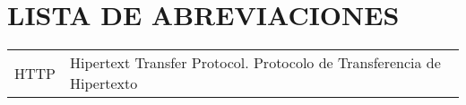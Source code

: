 \chapter*{LISTA DE ABREVIACIONES}

\begin{center}
    \begin{tabular}{ll}
    HTTP         &\hspace{2cm} Hipertext Transfer Protocol. Protocolo de 
                               Transferencia de Hipertexto            \\
    \end{tabular}
\end{center}
\clearpage
